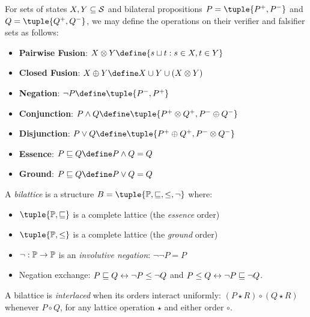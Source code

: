 \documentclass[../LogosReference.tex]{subfiles}
\begin{document}
\begin{definition}\label{def:propositional-operations}
	For sets of states $X, Y \subseteq \mathcal{S}$ and bilateral propositions $P = \tuple{P^+, P^-}$ and $Q = \tuple{Q^+, Q^-}$, we may define the operations on their verifier and falsifier sets as follows:
	\begin{itemize}
		\item \textbf{Pairwise Fusion}: $X \otimes Y \define \set{\fusion{s}{t} : s \in X, t \in Y}$
		\item \textbf{Closed Fusion}: $X \oplus Y \define X \cup Y \cup (X \otimes Y)$
		\item \textbf{Negation}: $\neg P \define \tuple{P^-, P^+}$
		\item \textbf{Conjunction}: $P \land Q \define \tuple{P^+ \otimes Q^+, P^- \oplus Q^-}$
		\item \textbf{Disjunction}: $P \lor Q \define \tuple{P^+ \oplus Q^+, P^- \otimes Q^-}$
    \item \textbf{Essence}: $P \essence Q \define P \land Q = Q$
    \item \textbf{Ground}: $P \essence Q \define P \lor Q = Q$
	\end{itemize}
\end{definition}


\begin{definition}[Bilattice]\label{def:bilattice}
A \emph{bilattice} is a structure $B = \tuple{\props, \essence, \ground, \neg}$ where:
\begin{itemize}
	\item $\tuple{\props, \essence}$ is a complete lattice (the \emph{essence} order)
	\item $\tuple{\props, \ground}$ is a complete lattice (the \emph{ground} order)
	\item $\neg : \mathbb{P} \to \mathbb{P}$ is an \emph{involutive negation}: $\neg\neg P = P$
	\item Negation exchange: $P \sqsubseteq Q \leftrightarrow \neg P \leq \neg Q$ and $P \leq Q \leftrightarrow \neg P \sqsubseteq \neg Q$.
\end{itemize}
A bilattice is \emph{interlaced} when its orders interact uniformly:
$(P \star R) \circ (Q \star R)$ whenever $P \circ Q$, for any lattice operation $\star$ and either order $\circ$.
\end{definition}
\end{document}
